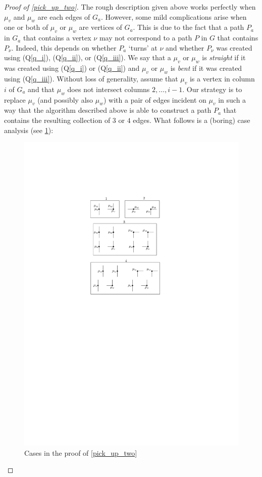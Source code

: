 \documentclass{patmorin}
\newcommand{\defin}[1]{\emph{\color{brightmaroon}#1}}
\begin{document}
\begin{proof}[Proof of \cref{pick_up_two}]
  The rough description given above works perfectly when $\mu_v$ and $\mu_w$ are each edges of $G_a$.  However, some mild complications arise when one or both of $\mu_v$ or $\mu_w$ are vertices of $G_a$.  This is due to the fact that a path $P_a$ in $G_a$ that contains a vertex $\nu$ may not correspond to a path $P$ in $G$ that contains $P_\nu$.  Indeed, this depends on whether $P_a$ `turns' at $\nu$ and whether $P_\nu$ was created using (Q\ref{q_i}), (Q\ref{q_ii}), or (Q\ref{q_iii}).  We say that a $\mu_v$ or $\mu_w$ is \defin{straight} if it was created using (Q\ref{q_i}) or (Q\ref{q_ii}) and $\mu_v$ or $\mu_w$ is \defin{bent} if it was created using (Q\ref{q_iii}).  Without loss of generality, assume that $\mu_v$ is a vertex in column $i$ of $G_a$ and that $\mu_w$ does not intersect columns $2,\ldots,i-1$.  Our strategy is to replace $\mu_v$ (and possibly also $\mu_w$) with a pair of edges incident on $\mu_v$ in such a way that the algorithm described above is able to construct a path $P_a$ that contains the resulting collection of $3$ or $4$ edges.  What follows is a (boring) case analysis (see \cref{cases}):

  \begin{figure}
    \begin{center}
      \includegraphics{figs/dumdum}
    \end{center}
    \caption{Cases in the proof of \cref{pick_up_two}}
    \label{cases}
  \end{figure}


\end{proof}
\end{document}
